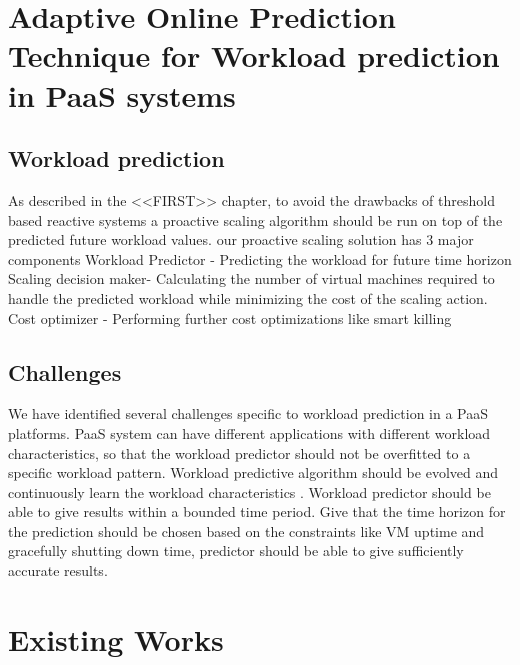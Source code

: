 \section{Adaptive Online Prediction Technique for Workload prediction in PaaS systems}

\subsection{Workload prediction }

As described in the <<FIRST>> chapter, to avoid the drawbacks of threshold based reactive systems a proactive scaling algorithm should be run on top of the predicted future workload values. our proactive scaling solution has 3 major components
Workload Predictor - Predicting the workload for future time horizon
Scaling decision maker- Calculating the number of virtual machines required to handle the predicted workload while minimizing the cost of the scaling action.
Cost optimizer - Performing further cost optimizations like smart killing

\subsection{Challenges}

We have identified several challenges specific to workload prediction in a PaaS platforms.
PaaS system can have different applications with different workload characteristics, so that the workload predictor should not be overfitted to a specific workload pattern.
Workload predictive algorithm should be evolved and continuously learn the workload characteristics . 
Workload predictor should be able to give results within a bounded time period.
Give that the  time horizon for the prediction should be chosen based on the constraints like VM uptime and gracefully shutting down time, predictor should be able to give sufficiently accurate results.

\section{Existing Works}

